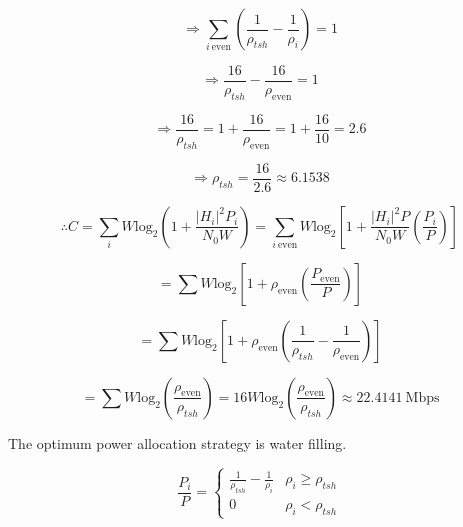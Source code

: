 \documentclass[fleqn]{article}
\begin{document}
\begin{enumerate}
		\begin{equation*}
			\Rightarrow \sum_{i\ \text{even}}{\left(\frac{1}{\rho_{tsh}} - \frac{1}{\rho_i}\right)} = 1
		\end{equation*}
		
		\begin{equation*}
			\Rightarrow \frac{16}{\rho_{tsh}} - \frac{16}{\rho_{\text{even}}} = 1
		\end{equation*}
		
		\begin{equation*}
			\Rightarrow \frac{16}{\rho_{tsh}} = 1 + \frac{16}{\rho_{\text{even}}} = 1 + \frac{16}{10} = 2.6
		\end{equation*}
		
		\begin{equation*}
			\Rightarrow \rho_{tsh} = \frac{16}{2.6} \approx 6.1538
		\end{equation*}
		
		\begin{equation*}
			\therefore C = \sum_i{W\text{log}_2\left(1 + \frac{|H_i|^2P_i}{N_0W}\right)} = \sum_{i\ \text{even}}{W\text{log}_2\left[1 + \frac{|H_i|^2P}{N_0W}\left(\frac{P_i}{P}\right)\right]}
		\end{equation*}
		
		\begin{equation*}
			= \sum{W\text{log}_2\left[1 + \rho_{\text{even}}\left(\frac{P_\text{even}}{P}\right)\right]}
		\end{equation*}
		
		\begin{equation*}
			 = \sum{W\text{log}_2\left[1 + \rho_{\text{even}}\left(\frac{1}{\rho_{tsh}} - \frac{1}{\rho_{\text{even}}}\right)\right]}
		\end{equation*}
		
		\begin{equation*}
			 = \sum{W\text{log}_2\left(\frac{\rho_{\text{even}}}{\rho_{tsh}}\right)} = 16W\text{log}_2\left(\frac{\rho_{\text{even}}}{\rho_{tsh}}\right) \approx 22.4141\ \text{Mbps}
		\end{equation*}
		
		The optimum power allocation strategy is water filling.
		
		\begin{equation*}
			\frac{P_i}{P} = \begin{cases}
				\frac{1}{\rho_{tsh}} - \frac{1}{\rho_i} & \rho_i \geq \rho_{tsh} \\
				0 & \rho_i < \rho_{tsh}
			\end{cases}
		\end{equation*}
		

\end{enumerate}
\end{document}
